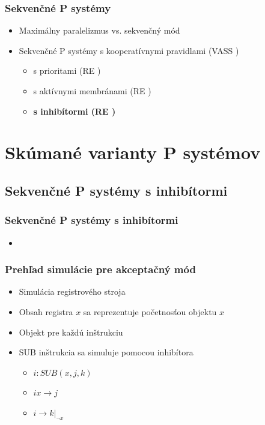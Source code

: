 \begin{frame}[t]\frametitle{Sekvenčné P systémy}
  \begin{itemize}
    \item Maximálny paralelizmus vs. sekvenčný mód
    \pause
    \item Sekvenčné P systémy s kooperatívnymi pravidlami (VASS \cite{Dang:2005:Sequential})
    \pause
    \begin{itemize}
      \item s prioritami (RE \cite{Dang:2005:Sequential})
      \pause
      \item s aktívnymi membránami (RE \cite{Dang:2005:Sequential})
      \pause
      \item {\bf s inhibítormi (RE \cite{Kovac14})}
    \end{itemize}
    \pause
    
  \end{itemize}
\end{frame}
\note{}



\section{Skúmané varianty P systémov} %
\label{sec:sk_man_varianty_p_syst_mov}

\subsection{Sekvenčné P systémy s inhibítormi} %
\label{sub:sekven_n_p_syst_my_s_inhib_tormi}

\begin{frame}[t]\frametitle{Sekvenčné P systémy s inhibítormi}
  \begin{itemize}
    \item {}
  \end{itemize}
\end{frame}


\begin{frame}[t]\frametitle{Prehľad simulácie pre akceptačný mód}
  \begin{itemize}
    \item Simulácia registrového stroja
    \pause
    \item Obsah registra $x$ sa reprezentuje početnosťou objektu $x$
    \item Objekt pre každú inštrukciu
    \pause
    \item SUB inštrukcia sa simuluje pomocou inhibítora
    \begin{itemize}
      \item $i: SUB(x,j,k)$
      \item $ix\rightarrow j$
      \item $i\rightarrow k|_{\neg{x}}$
    \end{itemize}
  \end{itemize}
\end{frame}
\note{}

